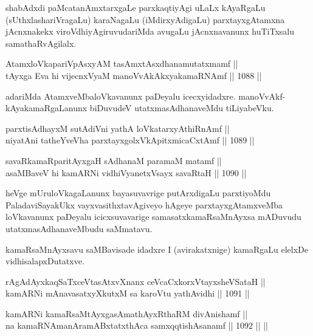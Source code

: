 \begin{artha}
shabAdxdi paMcatanAmxtarxgaLe parxkaqtiyAgi uLaLx kAyaRgaLu (sUthxlashariVragaLu) karaNagaLu (iMdirxyAdigaLu) parxtayxgAtamxna jAcnxnakekx viroVdhiyAgiruvudariMda avugaLu jAcnxnavanunx huTiTxsalu samathaRvAgilalx.
\end{artha}

\begin{shl}
AtamxloVkapariVpAsxyAM tasAmxtAsxdhanamutatxmamf || \\
tAyxga Eva hi vijecnxVyaM manoVvAkAkxyakamaRNAmf \hfill || 1088 ||  
\end{shl}

\begin{artha}
adariMda AtamxveMbaloVkavanunx paDeyalu icecxyidadxre. manoVvAkf-kAyakamaRgaLanunx biDuvudeV utatxmasAdhanaveMdu tiLiyabeVku.
\end{artha}

\begin{shl}
parxtisAdhayxM sutAdiVni yathA loVkatarxyAthiRnAmf || \\
niyatAni tatheYveVha parxtayxgolxVkApitxmicaCxtAmf \hfill || 1089 ||  
\end{shl}
				
\begin{shl}
savaRkamaRparitAyxgaH sAdhanaM paramaM matamf || \\
asaMBaveV hi kamARNi vidhiVyanetxV\s sayx savaRtaH \hfill || 1090 ||  
\end{shl}

\begin{artha}
heVge mUruloVkagaLanunx bayasuvavrige putArxdigaLu parxtiyoMdu PaladaviSayakUkx vayxvasithxtavAgiveyo hAgeye parxtayxgAtamxveMba loVkavanunx paDeyalu icicxsuvavarige samasatxkamaRsaMnAyxsa mADuvudu utatxmasAdhanaveMbudu saMmatavu.
\end{artha}

\begin{artha}
kamaRsaMnAyxsavu saMBavisade idadxre I (avirakatxnige) kamaRgaLu elelxDe vidhisalapxDutatxve.
\end{artha}

\begin{shl}
rAgAdAyxkaqSaTxceVtasAtxvXnanx ceVcaCxkorxVtayxsheVSataH || \\
kamARNi mAnavasatxyXkutxM sa karoVtu yathAvidhi \hfill || 1091 ||  
\end{shl}
				
\begin{shl}
kamARNi kamaRsaMtAyxgasAmathAyxRthaRM divAnishamf ||  \\
na kamaRNAmanAramABxtatxthAca samxqqtishAsanamf \hfill || 1092 ||  ||  
\end{shl}

